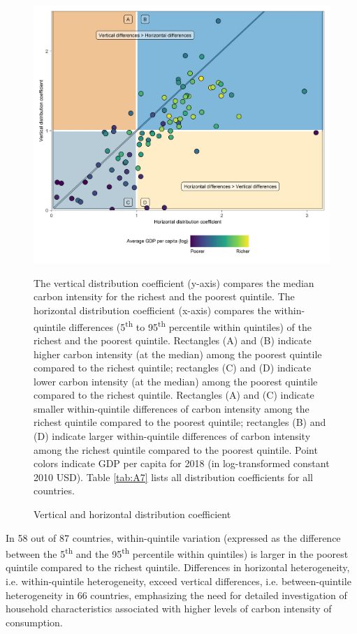 \documentclass[12pt, a4paper]{article}
\newenvironment{subcaption2}
{\strut
\vspace{-5pt}
\begin{minipage}[b]{0.9\textwidth}
  \hspace*{-\parindent}
  \footnotesize}
 {\end{minipage}}
\begin{document}
\begin{figure}[ht!]
    \centering
    \includegraphics{Figure 2/Figure_2_2017}
    \caption{Vertical and horizontal distribution coefficient}
    \label{fig:fig_2}
    \begin{subcaption2}
    The vertical distribution coefficient (y-axis) compares the median carbon intensity for the richest and the poorest quintile. The horizontal distribution coefficient (x-axis) compares the within-quintile differences (5\textsuperscript{th} to 95\textsuperscript{th} percentile within quintiles) of the richest and the poorest quintile. Rectangles (A) and (B) indicate higher carbon intensity (at the median) among the poorest quintile compared to the richest quintile; rectangles (C) and (D) indicate lower carbon intensity (at the median) among the poorest quintile compared to the richest quintile. Rectangles (A) and (C) indicate smaller within-quintile differences of carbon intensity among the richest quintile compared to the poorest quintile; rectangles (B) and (D) indicate larger within-quintile differences of carbon intensity among the richest quintile compared to the poorest quintile. Point colors indicate GDP per capita for 2018 (in log-transformed constant 2010 USD). Table \ref{tab:A7} lists all distribution coefficients for all countries.
    \end{subcaption2}
\end{figure}

In 58 out of 87 countries, within-quintile variation (expressed as the difference between the 5\textsuperscript{th} and the 95\textsuperscript{th} percentile within quintiles) is larger in the poorest quintile compared to the richest quintile. Differences in horizontal heterogeneity, i.e. within-quintile heterogeneity, exceed vertical differences, i.e. between-quintile heterogeneity in 66 countries, emphasizing the need for detailed investigation of household characteristics associated with higher levels of carbon intensity of consumption.
\end{document}
